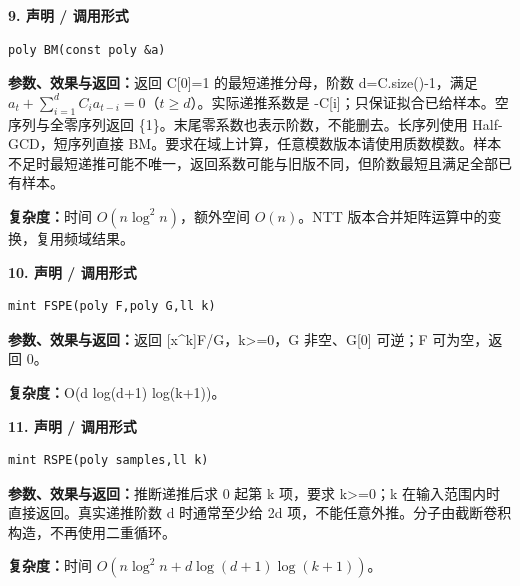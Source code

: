 \documentclass[UTF8,a4paper,10pt]{ctexart}
\begin{document}
\noindent\begin{minipage}{\textwidth}
\textbf{9. 声明 / 调用形式}
\begin{lstlisting}
poly BM(const poly &a)
\end{lstlisting}
\textbf{参数、效果与返回：}返回 C[0]=1 的最短递推分母，阶数 d=C.size()-1，满足 $a_t+\sum_{i=1}^d C_i a_{t-i}=0$（$t\ge d$）。实际递推系数是 -C[i]；只保证拟合已给样本。空序列与全零序列返回 \{1\}。末尾零系数也表示阶数，不能删去。长序列使用 Half-GCD，短序列直接 BM。要求在域上计算，任意模数版本请使用质数模数。样本不足时最短递推可能不唯一，返回系数可能与旧版不同，但阶数最短且满足全部已有样本。

\textbf{复杂度：}时间 $O(n\log^2 n)$，额外空间 $O(n)$。NTT 版本合并矩阵运算中的变换，复用频域结果。

\end{minipage}\par\vspace{0.4em}
\noindent\begin{minipage}{\textwidth}
\textbf{10. 声明 / 调用形式}
\begin{lstlisting}
mint FSPE(poly F,poly G,ll k)
\end{lstlisting}
\textbf{参数、效果与返回：}返回 [x\textasciicircum{}k]F/G，k>=0，G 非空、G[0] 可逆；F 可为空，返回 0。

\textbf{复杂度：}O(d log(d+1) log(k+1))。

\end{minipage}\par\vspace{0.4em}
\noindent\begin{minipage}{\textwidth}
\textbf{11. 声明 / 调用形式}
\begin{lstlisting}
mint RSPE(poly samples,ll k)
\end{lstlisting}
\textbf{参数、效果与返回：}推断递推后求 0 起第 k 项，要求 k>=0；k 在输入范围内时直接返回。真实递推阶数 d 时通常至少给 2d 项，不能任意外推。分子由截断卷积构造，不再使用二重循环。

\textbf{复杂度：}时间 $O(n\log^2 n+d\log(d+1)\log(k+1))$。

\end{minipage}\par\vspace{0.4em}
\end{document}
